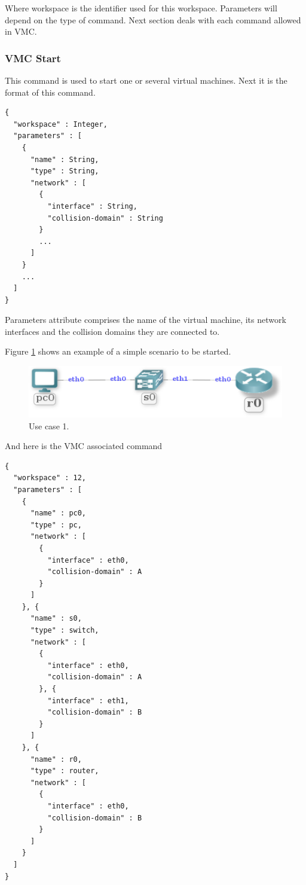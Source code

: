 \documentclass{article}
\begin{document}
Where workspace is the identifier used for this workspace. Parameters will depend on the type of command. Next section deals with each command allowed in VMC.

\subsubsection{VMC Start}
This command is used to start one or several virtual machines. Next it is the format of this command.

\begin{verbatim}
{
  "workspace" : Integer,
  "parameters" : [
    {
      "name" : String,
      "type" : String,
      "network" : [
        {
          "interface" : String,
          "collision-domain" : String
        }
        ...
      ]
    }
    ...
  ]
}
\end{verbatim}

Parameters attribute comprises the name of the virtual machine, its network interfaces and the collision domains they are connected to.

Figure \ref{img:vmc_scene1} shows an example of a simple scenario to be started.

\begin{figure}[h!]
  \centering
    \includegraphics[scale=0.7]{./img/vmc_scene1.png}
  \caption{Use case 1.}
  \label{img:vmc_scene1}
\end{figure}

And here is the VMC associated command

\begin{verbatim}
{
  "workspace" : 12,
  "parameters" : [
    {
      "name" : pc0,
      "type" : pc,
      "network" : [
        {
          "interface" : eth0,
          "collision-domain" : A
        }
      ]
    }, {
      "name" : s0,
      "type" : switch,
      "network" : [
        {
          "interface" : eth0,
          "collision-domain" : A
        }, {
          "interface" : eth1,
          "collision-domain" : B
        }
      ]
    }, {
      "name" : r0,
      "type" : router,
      "network" : [
        {
          "interface" : eth0,
          "collision-domain" : B
        }
      ]
    }
  ]
}
\end{verbatim}
\end{document}
